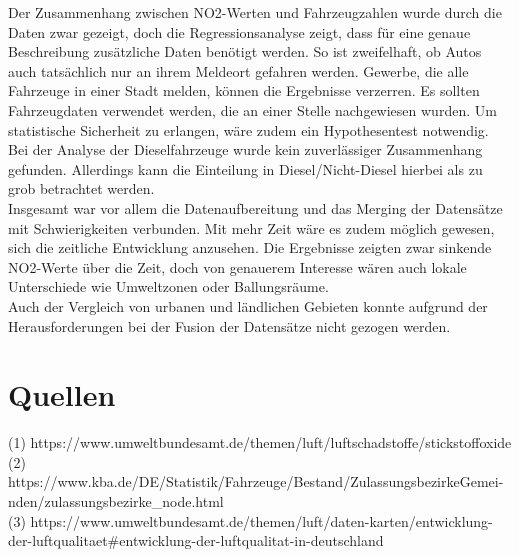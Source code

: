 \documentclass[11pt,a4paper,oneside,german]{article}
\begin{document}
	Der Zusammenhang zwischen NO2-Werten und Fahrzeugzahlen wurde durch die Daten zwar gezeigt, doch die Regressionsanalyse zeigt, dass für eine genaue Beschreibung zusätzliche Daten benötigt werden. So ist zweifelhaft, ob Autos auch tatsächlich nur an ihrem Meldeort gefahren werden. Gewerbe, die alle Fahrzeuge in einer Stadt melden, können die Ergebnisse verzerren. Es sollten Fahrzeugdaten verwendet werden, die an einer Stelle nachgewiesen wurden. Um statistische Sicherheit zu erlangen, wäre zudem ein Hypothesentest notwendig. \\
	Bei der Analyse der Dieselfahrzeuge wurde kein zuverlässiger Zusammenhang gefunden. Allerdings kann die Einteilung in Diesel/Nicht-Diesel hierbei als zu grob betrachtet werden. \\
	Insgesamt war vor allem die Datenaufbereitung und das Merging der Datensätze mit Schwierigkeiten verbunden. Mit mehr Zeit wäre es zudem möglich gewesen, sich die zeitliche Entwicklung anzusehen. Die Ergebnisse zeigten zwar sinkende NO2-Werte über die Zeit, doch von genauerem Interesse wären auch lokale Unterschiede wie Umweltzonen oder Ballungsräume. \\
	Auch der Vergleich von urbanen und ländlichen Gebieten konnte aufgrund der Herausforderungen bei der Fusion der Datensätze nicht gezogen werden. \\
	
	\section{Quellen}
	
	(1) https://www.umweltbundesamt.de/themen/luft/luftschadstoffe/stickstoffoxide\\
	(2) https://www.kba.de/DE/Statistik/Fahrzeuge/Bestand/ZulassungsbezirkeGemei-nden/zulassungsbezirke\_node.html\\
	(3) https://www.umweltbundesamt.de/themen/luft/daten-karten/entwicklung-der-luftqualitaet\#entwicklung-der-luftqualitat-in-deutschland
	
	
	
\end{document}
